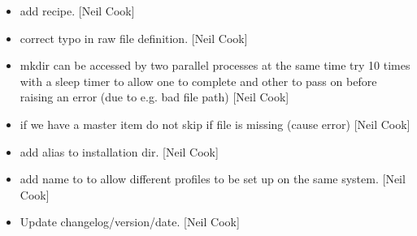 \documentclass[a4paper,10pt,english]{report}
\begin{document}
\begin{itemize}
\item {} 
 \sphinxhyphen{} add 
recipe. {[}Neil Cook{]}

\item {} 
 \sphinxhyphen{} correct typo in raw file
definition. {[}Neil Cook{]}

\item {} 
 \sphinxhyphen{} mkdir can be accessed by two parallel processes at
the same time \sphinxhyphen{} try 10 times with a sleep timer to allow one to
complete and other to pass on before raising an error (due to e.g. bad
file path) {[}Neil Cook{]}

\item {} 
 \sphinxhyphen{} if we have a master item do
not skip if file is missing (cause error) {[}Neil Cook{]}

\item {} 
 \sphinxhyphen{} add alias to installation dir. {[}Neil Cook{]}

\item {} 
 \sphinxhyphen{} add \textendash{}name to  to allow different profiles
to be set up on the same system. {[}Neil Cook{]}

\item {} 
Update changelog/version/date. {[}Neil Cook{]}

\end{itemize}
\end{document}

